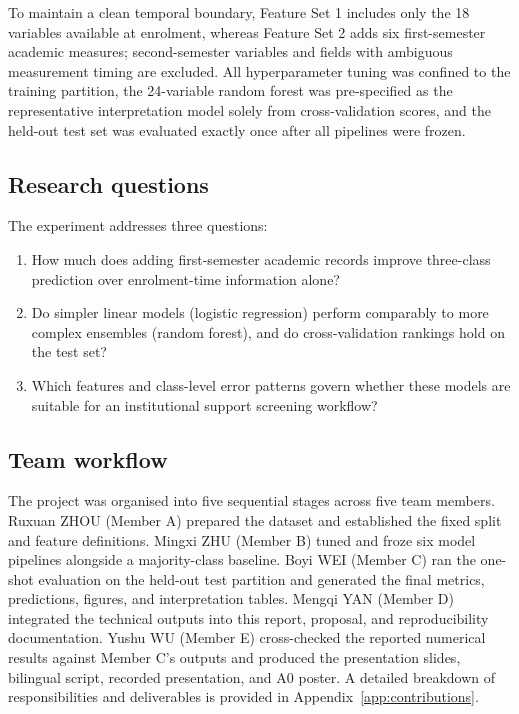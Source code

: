 \documentclass[11pt,a4paper]{article}
\begin{document}
To maintain a clean temporal boundary, Feature Set 1 includes only the 18 variables available at
enrolment, whereas Feature Set 2 adds six first-semester academic measures; second-semester
variables and fields with ambiguous measurement timing are excluded. All hyperparameter tuning was
confined to the training partition, the 24-variable random forest was pre-specified as the
representative interpretation model solely from cross-validation scores, and the held-out test set
was evaluated exactly once after all pipelines were frozen.

\subsection{Research questions}

The experiment addresses three questions:
\begin{enumerate}[leftmargin=*]
  \item How much does adding first-semester academic records improve three-class prediction over
  enrolment-time information alone?
  \item Do simpler linear models (logistic regression) perform comparably to more complex ensembles
  (random forest), and do cross-validation rankings hold on the test set?
  \item Which features and class-level error patterns govern whether these models are suitable for
  an institutional support screening workflow?
\end{enumerate}

\subsection{Team workflow}

The project was organised into five sequential stages across five team members. Ruxuan ZHOU
(Member A) prepared the dataset and established the fixed split and feature definitions. Mingxi ZHU
(Member B) tuned and froze six model pipelines alongside a majority-class baseline. Boyi WEI
(Member C) ran the one-shot evaluation on the held-out test partition and generated the final
metrics, predictions, figures, and interpretation tables. Mengqi YAN (Member D) integrated the
technical outputs into this report, proposal, and reproducibility documentation. Yushu WU
(Member E) cross-checked the reported numerical results against Member C's outputs and produced the
presentation slides, bilingual script, recorded presentation, and A0 poster. A detailed breakdown of
responsibilities and deliverables is provided in Appendix~\ref{app:contributions}.
\end{document}
